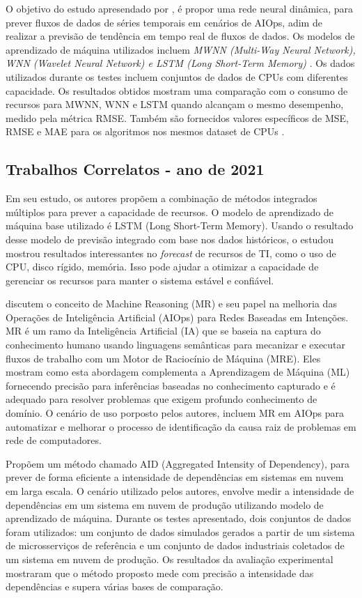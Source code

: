 O objetivo do estudo apresendado por \cite{9443765}, é propor uma rede neural dinâmica, para prever fluxos de dados de séries temporais em cenários de AIOps, adim de realizar a previsão de tendência em tempo real de fluxos de dados. Os modelos de aprendizado de máquina utilizados incluem \textit{MWNN (Multi-Way Neural Network), WNN (Wavelet Neural Network) e LSTM (Long Short-Term Memory) }. Os dados utilizados durante os testes incluem conjuntos de dados de CPUs com diferentes capacidade. Os resultados obtidos mostram uma comparação com o consumo de recursos para MWNN, WNN e LSTM quando alcançam o mesmo desempenho, medido pela métrica RMSE. Também são fornecidos valores específicos de MSE, RMSE e MAE para os algoritmos nos mesmos dataset de CPUs .



\subsection{Trabalhos Correlatos - ano de 2021}\label{trab_correlatos_21}

Em seu estudo, os autores \cite{9516546} propõem a combinação de métodos integrados múltiplos para prever a capacidade de recursos. O modelo de aprendizado de máquina base utilizado é LSTM (Long Short-Term Memory). Usando o resultado desse modelo de previsão integrado com base nos dados históricos,  o estudou mostrou resultados interessantes no \textit{forecast} de recursos de TI, como o uso de CPU, disco rígido, memória. Isso pode ajudar a otimizar a capacidade de gerenciar os recursos  para manter o sistema estável e confiável. 


\cite{9605403} discutem o conceito de Machine Reasoning (MR) e seu papel na melhoria das Operações de Inteligência Artificial (AIOps) para Redes Baseadas em Intenções. MR é um ramo da Inteligência Artificial (IA) que se baseia na captura do conhecimento humano usando linguagens semânticas para mecanizar e executar fluxos de trabalho com um Motor de Raciocínio de Máquina (MRE). Eles mostram como esta abordagem complementa a Aprendizagem de Máquina (ML) fornecendo  precisão para inferências baseadas no conhecimento capturado e é adequado para resolver problemas que exigem profundo conhecimento de domínio. O cenário de uso porposto pelos autores, incluem MR em AIOps para automatizar e melhorar o processo de identificação da causa raiz de problemas em rede de computadores.

\cite{9678534} Propõem um método chamado AID (Aggregated Intensity of Dependency), para prever de forma eficiente a intensidade de dependências em sistemas em nuvem em larga escala. O cenário utilizado pelos autores, envolve medir a intensidade de dependências em um sistema em nuvem de produção utilizando modelo de aprendizado de máquina. Durante os testes apresentado, dois conjuntos de dados foram utilizados: um conjunto de dados simulados gerados a partir de um sistema de microsserviços de referência e um conjunto de dados industriais coletados de um sistema em nuvem de produção. Os resultados da avaliação experimental mostraram que o método proposto mede com precisão a intensidade das dependências e supera várias bases de comparação.



